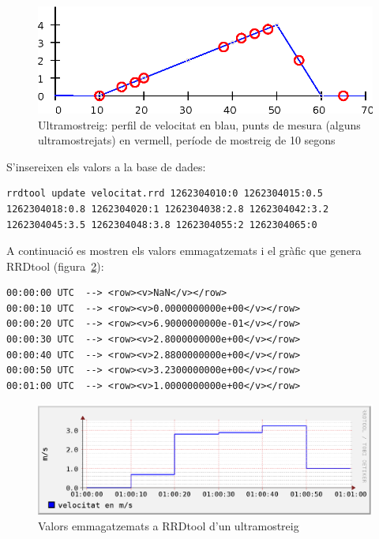 \begin{figure}[htp]
  \centering
  \includegraphics[width=\textwidth]{imatges/rrdtool/sobremostreig.eps}
  \caption{Ultramostreig: perfil de velocitat en blau, punts de mesura (alguns ultramostrejats) en vermell, període de mostreig de 10 segons}
  \label{fig:rrdtool:ultramostreig}
\end{figure}

S'insereixen els valors a la base de dades:
\begin{lstlisting}[style=sh]
rrdtool update velocitat.rrd 1262304010:0 1262304015:0.5 1262304018:0.8 1262304020:1 1262304038:2.8 1262304042:3.2 1262304045:3.5 1262304048:3.8 1262304055:2 1262304065:0
\end{lstlisting}

A continuació es mostren els valors emmagatzemats i el gràfic que genera RRDtool (figura~\ref{fig:rrdtool:velocitat_ultramostrejada}):

\begin{lstlisting}
00:00:00 UTC  --> <row><v>NaN</v></row>
00:00:10 UTC  --> <row><v>0.0000000000e+00</v></row>
00:00:20 UTC  --> <row><v>6.9000000000e-01</v></row>
00:00:30 UTC  --> <row><v>2.8000000000e+00</v></row>
00:00:40 UTC  --> <row><v>2.8800000000e+00</v></row>
00:00:50 UTC  --> <row><v>3.2300000000e+00</v></row>
00:01:00 UTC  --> <row><v>1.0000000000e+00</v></row>
\end{lstlisting}


\begin{figure}[htp]
  \centering
  \includegraphics[width=\textwidth]{imatges/rrdtool/velocitat_sobremostrejada.eps}
  \caption{Valors emmagatzemats a RRDtool d'un ultramostreig}
  \label{fig:rrdtool:velocitat_ultramostrejada}
\end{figure}

